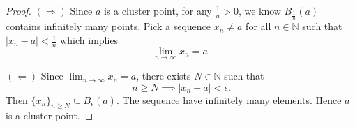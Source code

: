 \begin{Exercise}
\begin{proof}
$(\Longrightarrow)$
Since $a$ is a cluster point, for any $\frac{1}{n} > 0$, we know $B_{\frac{1}{n}}(a)$ contains infinitely many points. Pick a sequence $x_n \neq a$ for all $n\in\mathbb{N}$ such that $|x_n - a| < \frac{1}{n}$ which implies 
$$
\lim_{n\to\infty}x_n = a.
$$

\vspace{2ex}

$(\Longleftarrow)$
Since $\lim_{n\to\infty}x_n = a$, there exists $N\in\mathbb{N}$ such that
$$
n\geq N \implies |x_n - a| < \epsilon.
$$
Then $\{x_n\}_{n\geq N}\subseteq B_{\epsilon}(a).$ The sequence have infinitely many elements. Hence $a$ is a cluster point.
\end{proof}
\end{Exercise}